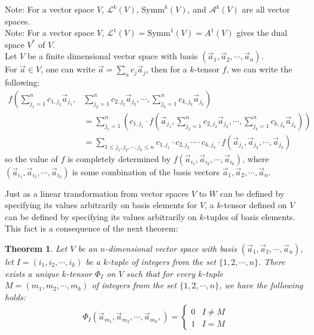 \documentclass[15pt]{book}
\theoremstyle{break}
\theoremstyle{break}
\newtheorem{thm}{Theorem}[section]
\newcommand{\Lt}{\mathcal{L}}
\newcommand{\Symm}{\text{Symm}}
\newcommand{\A}{\mathcal{A}}
\newcommand{\lr}[1]{\left(#1\right)}
\newcommand{\note}{\color{red}Note: \color{black}}
\begin{document}
\note For a vector space $V$, $\Lt^k(V)$, $\Symm^k(V)$, and $\A^k(V)$ are all vector spaces.\\ 
\note For a vector space $V$, $\Lt^1(V) = \Symm^1(V) = A^1(V)$ gives the dual space $V^*$ of $V$.\\


Let $V$ be a finite dimensional vector space with basis $(\vec{a}_1,\vec{a}_2,\cdots, \vec{a}_n)$. \\
For $\vec{a}\in V$, one can write $\vec{a} = \sum_n c_j \vec{a}_j$, then for a $k$-tensor $f$, we can write the following:
\begin{align*}
f\lr{\sum_{j_1=1}^n c_{1,j_1} \vec{a}_{j_1}, \right.&\left.\sum_{j_2=1}^n c_{2,j_2} \vec{a}_{j_2}, \cdots, \sum_{j_k=1}^n c_{k,j_k} \vec{a}_{j_k}} \\
&= \sum_{j_1=1}^n \left(c_{1,j_1}\cdot f\lr{\vec{a}_{j_1} , \sum_{j_2=1}^n c_{2,j_2} \vec{a}_{j_2}, \cdots, \sum_{j_k=1}^n c_{k,j_k} \vec{a}_{j_k}}\right) \\
&= \sum_{1\leq j_1, j_2,\cdots, j_k \leq n} c_{1,j_1}\cdot c_{2,j_2}\cdots \cdot c_{k,j_k}\cdot f(\vec{a}_{j_1}, \vec{a}_{j_2}, \cdots, \vec{a}_{j_k})  
\end{align*}
so the value of $f$ is completely determined by $f(\vec{a}_{i_1},\vec{a}_{i_2},\cdots, \vec{a}_{i_k})$, where $(\vec{a}_{i_1},\vec{a}_{i_2},\cdots, \vec{a}_{i_k})$ is some combination of the basis vectors $\vec{a}_1,\vec{a}_2,\cdots,\vec{a}_n$.\\
\hfill\break


Just as a linear transformation from vector spaces $V$ to $W$ can be defined by specifying its values arbitrarily on basis elements for $V$, a $k$-tensor defined on $V$ can be defined by specifying its values arbitrarily on $k$-tuples of basis elements. This fact is a consequence of the next theorem:

\begin{thm}
Let $V$ be an $n$-dimensional vector space with basis $(\vec{a}_1,\vec{a}_2,\cdots, \vec{a}_n)$, let $I = (i_1,i_2,\cdots, i_k)$ be a $k$-tuple of integers from the set $\{1,2,\cdots, n\}$. There exists a unique $k$-tensor $\Phi_I$ on $V$ such that for every $k$-tuple $M = (m_1,m_2,\cdots,m_k)$ of integers from the set $\{1,2,\cdots, n\}$, we have the following holds:
\begin{align*}
\Phi_I\left(\vec{a}_{m_1},\vec{a}_{m_2},\cdots, \vec{a}_{m_k},\right) = \begin{cases} 
0 & I \neq M \\
1 & I = M
\end{cases}
\end{align*}
\end{thm}
\end{document}
